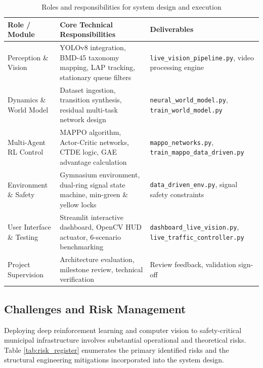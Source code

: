 \begin{table}[htbp]
\centering
\small
\caption{Roles and responsibilities for system design and execution}
\label{tab:roles_responsibilities}
\begin{tabularx}{\textwidth}{|p{3.5cm}|X|p{4.2cm}|}
\hline
\textbf{Role / Module} & \textbf{Core Technical Responsibilities} & \textbf{Deliverables} \\ \hline
Perception \& Vision & YOLOv8 integration, BMD-45 taxonomy mapping, LAP tracking, stationary queue filters & \texttt{live\_vision\_pipeline.py}, video processing engine \\ \hline
Dynamics \& World Model & Dataset ingestion, transition synthesis, residual multi-task network design & \texttt{neural\_world\_model.py}, \texttt{train\_world\_model.py} \\ \hline
Multi-Agent RL Control & MAPPO algorithm, Actor-Critic networks, CTDE logic, GAE advantage calculation & \texttt{mappo\_networks.py}, \texttt{train\_mappo\_data\_driven.py} \\ \hline
Environment \& Safety & Gymnasium environment, dual-ring signal state machine, min-green \& yellow locks & \texttt{data\_driven\_env.py}, signal safety constraints \\ \hline
User Interface \& Testing & Streamlit interactive dashboard, OpenCV HUD actuator, 6-scenario benchmarking & \texttt{dashboard\_live\_vision.py}, \texttt{live\_traffic\_controller.py} \\ \hline
Project Supervision & Architecture evaluation, milestone review, technical verification & Review feedback, validation sign-off \\ \hline
\end{tabularx}
\end{table}

\subsection{Challenges and Risk Management}
Deploying deep reinforcement learning and computer vision to safety-critical municipal infrastructure involves substantial operational and theoretical risks. Table \ref{tab:risk_register} enumerates the primary identified risks and the structural engineering mitigations incorporated into the system design.

